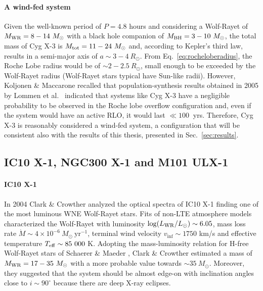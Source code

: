 \documentclass[a4paper,titlepage]{book}     	%
\newcommand{\sun}{\ensuremath{_\odot}}
\newcommand{\mdot}{\ensuremath{\dot{M}}}
\newcommand{\msun}{\ensuremath{M\sun}}
\newcommand{\rsun}{R_{\odot}}
\newcommand{\lsun}{L_{\odot}}
\newcommand{\yr}{\text{yr}}
\newcommand{\mwr}{\ensuremath{M_\textup{WR}}}
\newcommand{\mbh}{\ensuremath{M_\textup{BH}}}
\begin{document}
\paragraph{A wind-fed system} Given the well-known period of $P=4.8$ hours and considering a Wolf-Rayet of $\mwr = 8-14~\msun$ with a black hole companion of $\mbh = 3-10~\msun$, the total mass of Cyg X-3 is $M_{\rm tot} = 11 - 24~\msun$ and, according to Kepler's third law, results in a semi-major axis of $a \sim 3-4~\rsun$. From Eq.\ \ref{eq:rocheloberadius}, the Roche Lobe radius would be of $\sim 2-2.5~\rsun$, small enough to be exceeded by the Wolf-Rayet radius (Wolf-Rayet stars typical have Sun-like radii). However, Koljonen \& Maccarone \cite{CygX-3_Koljonen2017} recalled that population-synthesis results obtained in 2005 by Lommen et al.\ \cite{CygX-3_Lommen2005_Ppdot} indicated that systems like Cyg X-3 have a negligible probability to be observed in the Roche lobe overflow configuration and, even if the system would have an active RLO, it would last $\ll 100~$ yrs. Therefore, Cyg X-3 is reasonably considered a wind-fed system, a configuration that will be consistent also with the results of this thesis, presented in Sec.\ \ref{sec:results}. 




\subsection{IC10 X-1, NGC300 X-1 and M101 ULX-1}\label{subsec:IC10X1_revisedmasses}

\paragraph{IC10 X-1} In 2004 Clark \& Crowther \cite{IC10X-1_Clark2004_WRmass} analyzed the optical spectra of IC10 X-1 finding one of the most luminous WNE Wolf-Rayet stars. Fits of non-LTE atmosphere models characterized the Wolf-Rayet with luminosity $\log(L_{\rm WR}/\lsun) \sim 6.05$, mass loss rate $\mdot \sim 4 \times 10^{-6}~\msun~\yr^{-1}$, terminal wind velocity $v_{\inf} \sim 1750$ km/s and effective temperature $T_{\rm eff} \sim 85~000$ K. Adopting the mass-luminosity relation for H-free Wolf-Rayet stars of Schaerer \& Maeder \cite{schaerer1992MLrelationWR}, Clark \& Crowther estimated a mass of $\mwr = 17-35~\msun$ with a more probable value towards $\sim 35~\msun$. Moreover, they suggested that the system should be almost edge-on with inclination angles close to $i \sim 90^{\circ}$ because there are deep X-ray eclipses.
\end{document}
